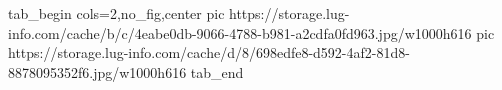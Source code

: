  
 
 
 
 


\ifcmt
  tab_begin cols=2,no_fig,center
     pic https://storage.lug-info.com/cache/b/c/4eabe0db-9066-4788-b981-a2cdfa0fd963.jpg/w1000h616
		 pic https://storage.lug-info.com/cache/d/8/698edfe8-d592-4af2-81d8-8878095352f6.jpg/w1000h616
  tab_end
\fi
